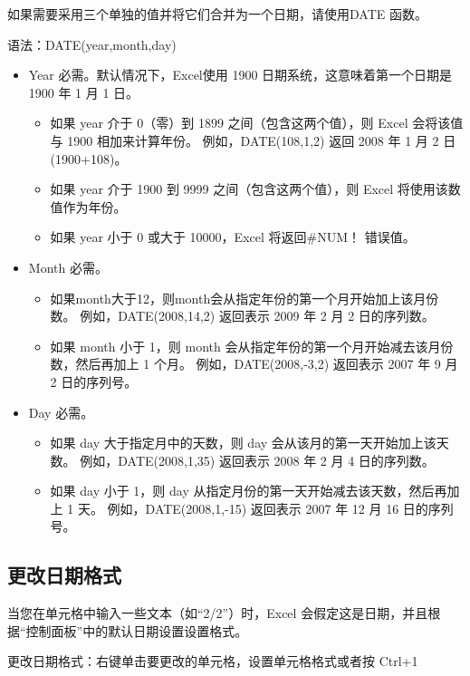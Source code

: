 如果需要采用三个单独的值并将它们合并为一个日期，请使用DATE 函数。

语法：DATE(year,month,day)

\begin{itemize}
    \item Year 必需。默认情况下，Excel使用 1900 日期系统，这意味着第一个日期是 1900 年 1 月 1 日。
        \begin{itemize}
            \item 如果 year 介于 0（零）到 1899 之间（包含这两个值），则 Excel 会将该值与 1900 相加来计算年份。 例如，DATE(108,1,2) 返回 2008 年 1 月 2 日 (1900+108)。
            \item 如果 year 介于 1900 到 9999 之间（包含这两个值），则 Excel 将使用该数值作为年份。 
            \item 如果 year 小于 0 或大于 10000，Excel 将返回\#NUM！ 错误值。
        \end{itemize}
    \item Month 必需。
        \begin{itemize}
            \item 如果month大于12，则month会从指定年份的第一个月开始加上该月份数。 例如，DATE(2008,14,2) 返回表示 2009 年 2 月 2 日的序列数。
            \item 如果 month 小于 1，则 month 会从指定年份的第一个月开始减去该月份数，然后再加上 1 个月。 例如，DATE(2008,-3,2) 返回表示 2007 年 9 月 2 日的序列号。
        \end{itemize}
    \item Day 必需。
        \begin{itemize}
            \item 如果 day 大于指定月中的天数，则 day 会从该月的第一天开始加上该天数。 例如，DATE(2008,1,35) 返回表示 2008 年 2 月 4 日的序列数。
            \item 如果 day 小于 1，则 day 从指定月份的第一天开始减去该天数，然后再加上 1 天。 例如，DATE(2008,1,-15) 返回表示 2007 年 12 月 16 日的序列号。
        \end{itemize}
\end{itemize}


\subsection{更改日期格式}

当您在单元格中输入一些文本（如``2/2''）时，Excel 会假定这是日期，并且根据``控制面板''中的默认日期设置设置格式。

更改日期格式：右键单击要更改的单元格，设置单元格格式或者按 Ctrl+1

